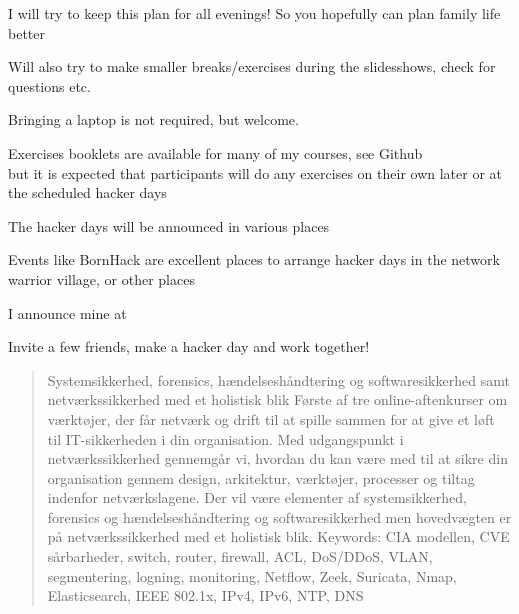 \documentclass[Screen16to9,17pt]{foils}
\begin{document}
\centerline{I will try to keep this plan for all evenings! So you hopefully can plan family life better}

Will also try to make smaller breaks/exercises during the slidesshows, check for questions etc.





\begin{list2}
\item Bringing a laptop is not required, but welcome.
\item Exercises booklets are available for many of my courses, see Github\\
but it is expected that participants will do any exercises on their own later or at the scheduled hacker days
\item The hacker days will be announced in various places

\item Events like BornHack are excellent places to arrange hacker days in the network warrior village, or other places
\item I announce mine at 
\end{list2}

\vskip 1cm

\centerline{\LARGE Invite a few friends, make a hacker day and work together!}





\begin{quote}
Systemsikkerhed, forensics, hændelseshåndtering og softwaresikkerhed samt netværkssikkerhed med et holistisk blik
Første af tre online-aftenkurser om værktøjer, der får netværk og drift til at spille sammen for at give et løft til IT-sikkerheden i din organisation. Med udgangspunkt i netværkssikkerhed gennemgår vi, hvordan du kan være med til at sikre din organisation gennem design, arkitektur, værktøjer, processer og tiltag indenfor netværkslagene. Der vil være elementer af systemsikkerhed, forensics og hændelseshåndtering og softwaresikkerhed men hovedvægten er på netværkssikkerhed med et holistisk blik.
\vskip 5mm
Keywords: CIA modellen, CVE sårbarheder, switch, router, firewall, ACL, DoS/DDoS, VLAN, segmentering, logning, monitoring, Netflow, Zeek, Suricata, Nmap, Elasticsearch, IEEE 802.1x, IPv4, IPv6, NTP, DNS
\end{quote}
\end{document}
